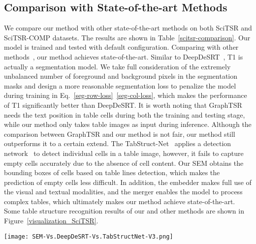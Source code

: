 \documentclass[review]{elsarticle}
\begin{document}
\subsection{Comparison with State-of-the-art Methods}
We compare our method with other state-of-the-art methods on both SciTSR and SciTSR-COMP datasets. The results are shown in Table~\ref{scitsr-comparison}. Our model is trained and tested with default configuration. Comparing with other methods~\cite{GraphTSR,DeepDeSRT,TabStructNet}, our method achieves state-of-the-art. Similar to DeepDeSRT~\cite{DeepDeSRT}, T1 is actually a segmentation model. We take full consideration of the extremely unbalanced number of foreground and background pixels in the segmentation masks and design a more reasonable segmentation loss to penalize the model during training in Eq.~\ref{seg-row-loss}~\ref{seg-col-loss}, which makes the performance of T1 significantly better than DeepDeSRT. It is worth noting that GraphTSR~\cite{GraphTSR} needs the text position in table cells during both the training and testing stage, while our method only takes table images as input during inference. Although the comparison between GraphTSR and our method is not fair, our method still outperforms it to a certain extend. The TabStruct-Net~\cite{TabStructNet} applies a detection network~\cite{MaskRCNN} to detect individual cells in a table image, however, it fails to capture empty cells accurately due to the absence of cell content. Our SEM obtains the bounding boxes of cells based on table lines detection, which makes the prediction of empty cells less difficult. In addition, the embedder makes full use of the visual and textual modalities, and the merger enables the model to process complex tables, which ultimately makes our method achieve state-of-the-art. Some table structure recognition results of our and other methods are shown in Figure~\ref{visualization_SciTSR}.

\begin{figure*}[!htb]
	\centerline{\texttt{[image: SEM-Vs.DeepDeSRT-Vs.TabStructNet-V3.png]}}
	\caption{Some structure recognition results of our and other methods on table images of the SciTSR dataset. The blue lines denote the prediction of table structure. \textbf{First Row:} the results of the DeepDeSRT. \textbf{Second Row:} the intermediate cell detection results of the TabStruct-Net. \textbf{Third Row:} the results of our method. The predictions of table structure in the third row are all correct.}
	\label{visualization_SciTSR}
\end{figure*}
\end{document}
